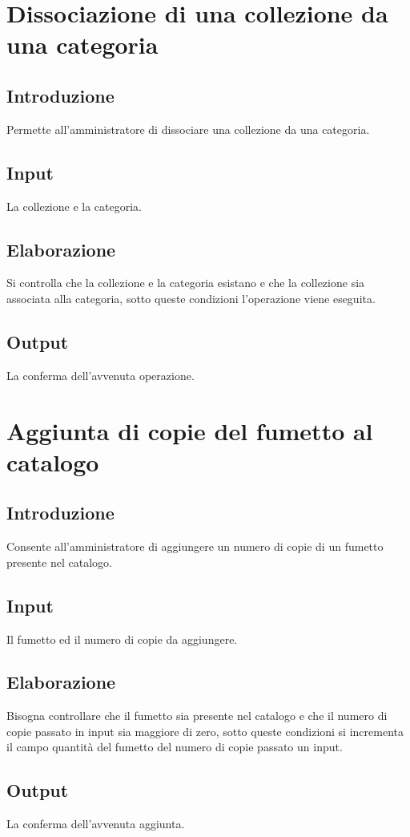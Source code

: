 \documentclass{scrreprt}
\begin{document}
\section{Dissociazione di una collezione da una categoria}

\subsection*{Introduzione}
Permette all'amministratore di dissociare una collezione da una categoria.
\subsection*{Input}
La collezione e la categoria.
\subsection*{Elaborazione}
Si controlla che la collezione e la categoria esistano e che la collezione sia associata alla categoria, sotto
queste condizioni l'operazione viene eseguita.
\subsection*{Output}
La conferma dell'avvenuta operazione.

\section{Aggiunta di copie del fumetto al catalogo}

\subsection*{Introduzione}
Consente all'amministratore di aggiungere un numero di copie di un fumetto presente nel catalogo.
\subsection*{Input}
Il fumetto ed il numero di copie da aggiungere.
\subsection*{Elaborazione}
Bisogna controllare che il fumetto sia presente nel catalogo e che il numero di copie passato in input sia
maggiore di zero, sotto queste condizioni si incrementa il campo quantità del fumetto del numero di copie
passato un input.
\subsection*{Output}
La conferma dell'avvenuta aggiunta.
\end{document}
